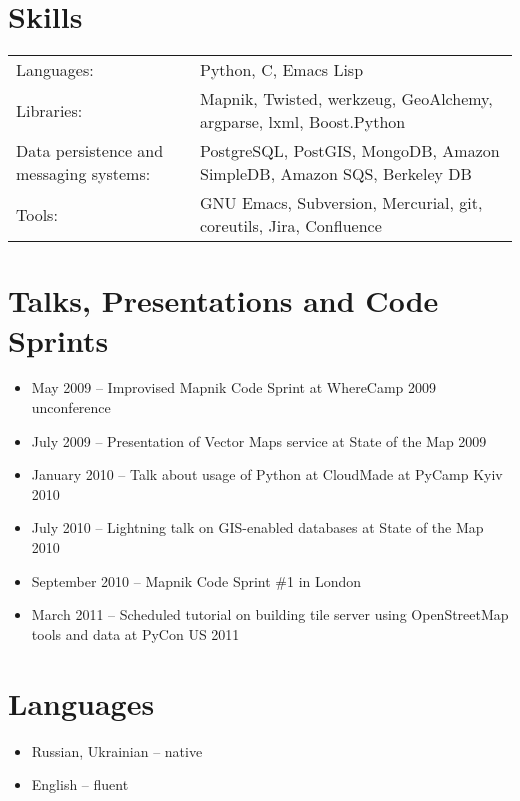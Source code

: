 \documentclass[margin]{res}
\begin{document}
\begin{resume}
\section{Skills}
\begin{tabular}{l p{3in}}
  Languages: & Python, C, Emacs Lisp \\
  Libraries: & Mapnik, Twisted, werkzeug, GeoAlchemy, argparse, lxml, Boost.Python \\
  Data persistence and messaging systems: & PostgreSQL, PostGIS, MongoDB, Amazon SimpleDB, Amazon SQS, Berkeley DB \\
  Tools: & GNU Emacs, Subversion, Mercurial, git, coreutils, Jira, Confluence
\end{tabular}

\section{Talks, Presentations and Code Sprints}

\begin{itemize}
\item May 2009 -- Improvised Mapnik Code Sprint at WhereCamp 2009 unconference
\item July 2009 -- Presentation of Vector Maps service at State of the Map 2009
\item January 2010 -- Talk about usage of Python at CloudMade at PyCamp Kyiv 2010
\item July 2010 -- Lightning talk on GIS-enabled databases at State of the Map 2010
\item September 2010 -- Mapnik Code Sprint \#1 in London
\item March 2011 -- Scheduled tutorial on building tile server using OpenStreetMap tools and data at PyCon US 2011
\end{itemize}

\section{Languages}
\begin{itemize} \itemsep -1pt
\item Russian, Ukrainian -- native
\item English -- fluent
\end{itemize}

\end{resume}
\end{document}

